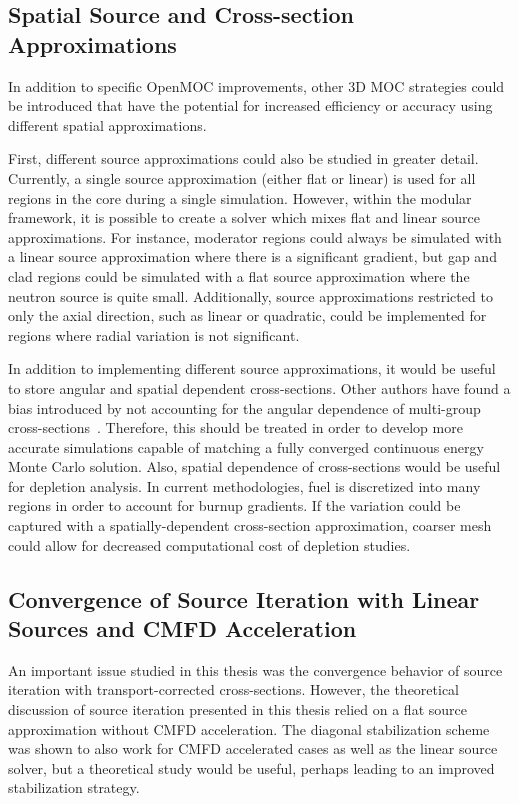 \subsection{Spatial Source and Cross-section Approximations}

In addition to specific OpenMOC improvements, other 3D \ac{MOC} strategies could be introduced that have the potential for increased efficiency or accuracy using different spatial approximations.

First, different source approximations could also be studied in greater detail. Currently, a single source approximation (either flat or linear) is used for all regions in the core during a single simulation. However, within the modular framework, it is possible to create a solver which mixes flat and linear source approximations. For instance, moderator regions could always be simulated with a linear source approximation where there is a significant gradient, but gap and clad regions could be simulated with a flat source approximation where the neutron source is quite small. Additionally, source approximations restricted to only the axial direction, such as linear or quadratic, could be implemented for regions where radial variation is not significant.

In addition to implementing different source approximations, it would be useful to store angular and spatial dependent cross-sections. Other authors have found a bias introduced by not accounting for the angular dependence of multi-group cross-sections~\cite{gibson-preprint}. Therefore, this should be treated in order to develop more accurate simulations capable of matching a fully converged continuous energy Monte Carlo solution. Also, spatial dependence of cross-sections would be useful for depletion analysis. In current methodologies, fuel is discretized into many regions in order to account for burnup gradients. If the variation could be captured with a spatially-dependent cross-section approximation, coarser mesh could allow for decreased computational cost of depletion studies.

\subsection{Convergence of Source Iteration with Linear Sources and CMFD Acceleration}

An important issue studied in this thesis was the convergence behavior of source iteration with transport-corrected cross-sections. However, the theoretical discussion of source iteration presented in this thesis relied on a flat source approximation without \ac{CMFD} acceleration. The diagonal stabilization scheme was shown to also work for \ac{CMFD} accelerated cases as well as the linear source solver, but a theoretical study would be useful, perhaps leading to an improved stabilization strategy.


